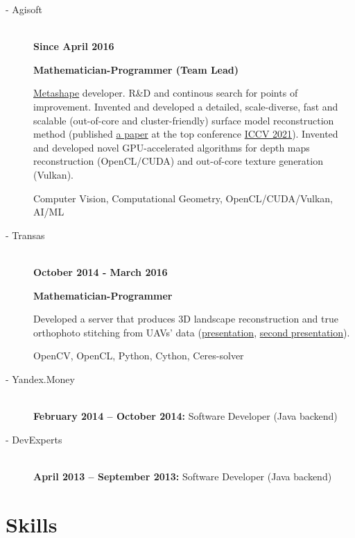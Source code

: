 \documentclass[11pt,oneside]{article}
\newcommand{\hhref}[2]{\href{#1}{\color{blue}#2}}
\begin{document}
\begin{description}
  \item[ - Agisoft] \hfill \\
    \textbf{Since April 2016}

    \textbf{Mathematician-Programmer (Team Lead)}

    \hhref{https://en.wikipedia.org/wiki/PhotoScan}{Metashape} developer. R\&D and continous search for points of improvement.
    Invented and developed a detailed, scale-diverse, fast and scalable (out-of-core and cluster-friendly) surface model reconstruction method (published \hhref{https://www.polarnick.com/static/papers/poliarnyi2021.pdf}{a paper} at the top conference \hhref{http://iccv2021.thecvf.com/}{ICCV 2021}).
    Invented and developed novel GPU-accelerated algorithms for depth maps reconstruction (OpenCL/CUDA) and out-of-core texture generation (Vulkan).

    Computer Vision, Computational Geometry, OpenCL/CUDA/Vulkan, AI/ML
  \item[ - Transas] \hfill \\
    \textbf{October 2014 - March 2016}

    \textbf{Mathematician-Programmer}

    Developed a server that produces 3D landscape reconstruction and true orthophoto stitching from UAVs' data (\hhref{http://polarnick239.github.io/old/cv/Monoceros1.pdf}{presentation}, \hhref{http://polarnick239.github.io/old/cv/Monoceros2.pdf}{second presentation}).

    OpenCV, OpenCL, Python, Cython, Ceres-solver
  \item[ - Yandex.Money] \hfill \\
    \textbf{February 2014 – October 2014:} Software Developer (Java backend)
  \item[ - DevExperts] \hfill \\
    \textbf{April 2013 – September 2013:} Software Developer (Java backend)

\end{description}


\vspace{-9pt}
\section*{\textbf{Skills}}
\vspace{-9pt}
\end{document}
